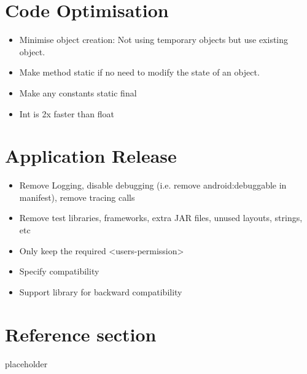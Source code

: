 \documentclass{article}
\begin{document}
\section{Code Optimisation}

\begin{itemize}
  \item Minimise object creation: Not using temporary objects but use existing object.
  \item Make method static if no need to modify the state of an object.
  \item Make any constants static final
  \item Int is 2x faster than float
\end{itemize}

\section{Application Release}

\begin{itemize}
  \item Remove Logging, disable debugging (i.e. remove android:debuggable in manifest), remove tracing calls
  \item Remove test libraries, frameworks, extra JAR files, unused layouts, strings, etc
  \item Only keep the required <users-permission>
  \item Specify compatibility 
  \item Support library for backward compatibility
\end{itemize}

\pagebreak
\section*{Reference section} \label{sec:reference}
\begin{description}
	\item[placeholder] \hfill \\
\end{description}
\end{document}
